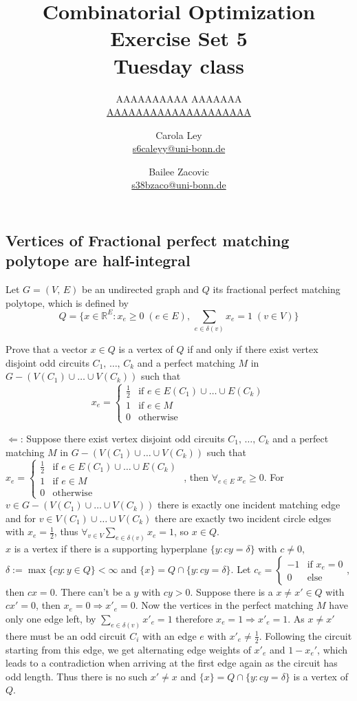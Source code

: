 \documentclass{article}
\title{Combinatorial Optimization \\ Exercise Set 5 \\ Tuesday class}
\author{
  AAAAAAAAAA AAAAAAA \\
  \href{mailto:AAAAAAAAAAAAAAAAAAAA}{AAAAAAAAAAAAAAAAAAAA}
  \and
  Carola Ley \\
  \href{mailto:s6caleyy@uni-bonn.de}{s6caleyy@uni-bonn.de}
  \and
  Bailee Zacovic \\
  \href{mailto:s38bzaco@uni-bonn.de}{s38bzaco@uni-bonn.de}
}
\newcommand{\R}{\mathbb{R}}
\begin{document}
  \maketitle

  \setcounter{section}{5}
  \subsection{Vertices of Fractional perfect matching polytope are half-integral}
  \begin{centerframebox}
    Let $G = (V,\, E)$ be an undirected graph and $Q$ its fractional perfect
    matching polytope, which is defined by
    \[ Q = \{x \in \R^E : x_e \geq 0\; (e \in E),\, \sum_{e \in \delta(v)} x_e = 1\; (v \in V)\} \]

    Prove that a vector $x \in Q$ is a vertex of $Q$ if and only if there exist vertex disjoint
    odd circuits $C_1,\, \dots,\, C_k$ and a perfect matching $M$ in $G - (V(C_1) \cup\dots\cup V(C_k))$
    such that
    \[ x_e = \begin{cases}
      \frac{1}{2} & \textrm{if } e \in E(C_1) \cup\dots\cup E(C_k) \\
      1 & \textrm{if } e \in M \\
      0 & \textrm{otherwise}
    \end{cases} \]
  \end{centerframebox}
  $\Leftarrow$: Suppose there exist vertex disjoint
    odd circuits $C_1,\, \dots,\, C_k$ and a perfect matching $M$ in $G - (V(C_1) \cup\dots\cup V(C_k))$ such that
   $  x_e = \begin{cases}
      \frac{1}{2} & \textrm{if } e \in E(C_1) \cup\dots\cup E(C_k) \\
      1 & \textrm{if } e \in M \\
      0 & \textrm{otherwise}
    \end{cases} $
    , then $\forall_{e\in E}~ x_e\geq 0$. For $v\in G - (V(C_1) \cup\dots\cup V(C_k))$ there is exactly one incident matching edge and for $v\in V(C_1) \cup\dots\cup V(C_k)$ there are exactly two incident circle  edges with $x_e=\frac 12$, thus $\forall_{v\in V} \sum_{e \in \delta(v)} x_e = 1$, so $x\in Q$.\\
    $x$ is a vertex if there is a supporting hyperplane $\{y:cy=\delta\}$ with $c\neq 0$, $\delta:= \max \{cy:y\in Q\}<\infty$ and $\{x\}=Q\cap \{y:cy=\delta\}$. Let $c_e= \begin{cases}-1 & \text{if } x_e=0\\ 0& \text{else} \end{cases} $, then $cx=0$. There can't be a $y$ with $cy>0$. Suppose there is a $x\neq x'\in Q$ with $cx'=0$, then $x_e=0 \Rightarrow x'_e=0$. Now the vertices in the perfect matching $M$ have only one edge left, by $\sum_{e \in \delta(v)} x'_e = 1$ therefore $x_e=1 \Rightarrow x'_e=1$. As $x\neq x'$ there must be an odd circuit $C_i$ with an edge $e$ with $x'_e\neq \frac 12$. Following the circuit starting from this edge, we get alternating edge weights of $x'_e$ and $1-x_e'$, which leads to a contradiction when arriving at the first edge again as the circuit has odd length. Thus there is no such $x'\neq x$ and $\{x\}=Q\cap \{y:cy=\delta\}$ is a vertex of $Q$.\\
\end{document}
